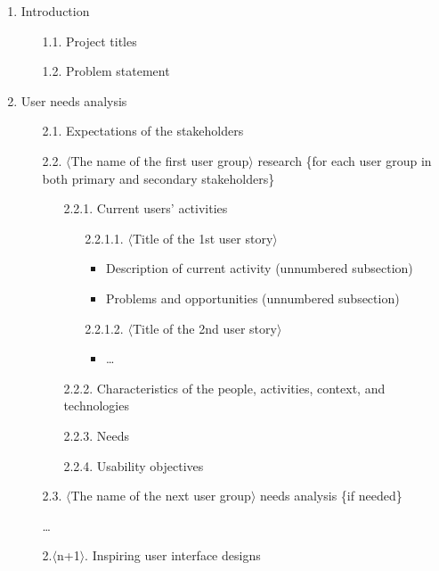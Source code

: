 \documentclass[]{VUMIFTemplateClass}
\begin{document}
\begin{enumerate}
    \item Introduction \checkmark
    \begin{enumerate}
        \item[1.1.] Project titles \checkmark
        \item[1.2.] Problem statement \checkmark
    \end{enumerate}
    
    \item User needs analysis
    \begin{enumerate}
        \item[2.1.] Expectations of the stakeholders \checkmark
        \item[2.2.] $\langle$The name of the first user group$\rangle$ research \{for each user group in both primary and secondary stakeholders\} \checkmark
        \begin{enumerate}
            \item[2.2.1.] Current users' activities
            \begin{enumerate}
                \item[2.2.1.1.] $\langle$Title of the 1st user story$\rangle$
                \begin{itemize}
                    \item Description of current activity (unnumbered subsection)
                    \item Problems and opportunities (unnumbered subsection)
                \end{itemize}
                \item[2.2.1.2.] $\langle$Title of the 2nd user story$\rangle$
                \begin{itemize}
                    \item \ldots
                \end{itemize}
            \end{enumerate}
            \item[2.2.2.] Characteristics of the people, activities, context, and technologies
            \item[2.2.3.] Needs
            \item[2.2.4.] Usability objectives
        \end{enumerate}
        \item[2.3.] $\langle$The name of the next user group$\rangle$ needs analysis \{if needed\}
        \item[] \ldots
        \item[2.$\langle$n+1$\rangle$.] Inspiring user interface designs
    \end{enumerate}
\end{enumerate}
\end{document}
